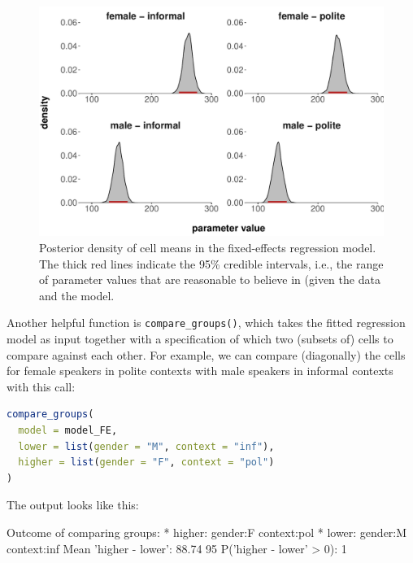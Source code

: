 \documentclass[nobib]{tufte-handout}
\begin{document}
\begin{figure}
  \centering
  \includegraphics[width=\textwidth]{pics/posterior_density_cell_means.pdf}
  \caption[Posteriors over cell means in fixed-effects model]{Posterior density of cell means
    in the fixed-effects regression model. The thick red lines indicate the 95\% credible
    intervals, i.e., the range of parameter values that are reasonable to believe in (given the data and the model.}
  \label{fig:Posteriors_cell_means}
\end{figure}


Another helpful function is \texttt{compare\_groups()}, which takes the fitted regression model as input together with a specification of which two (subsets of) cells to compare
against each other. For example, we can compare (diagonally) the cells for female speakers in
polite contexts with male speakers in informal contexts with this call:

\begin{minipage}[]{1.3\textwidth}
\begin{lstlisting}[language=R]
compare_groups(
  model = model_FE, 
  lower = list(gender = "M", context = "inf"),
  higher = list(gender = "F", context = "pol")
)
\end{lstlisting}
\end{minipage}

\noindent The output looks like this:

\medskip

\begin{minipage}[]{\textwidth}
\begin{rc}
Outcome of comparing groups:
 * higher:  gender:F context:pol 
 * lower:   gender:M context:inf 
Mean 'higher - lower':  88.74 
95%
P('higher - lower' > 0):  1 
\end{rc}
\end{minipage}
\end{document}
